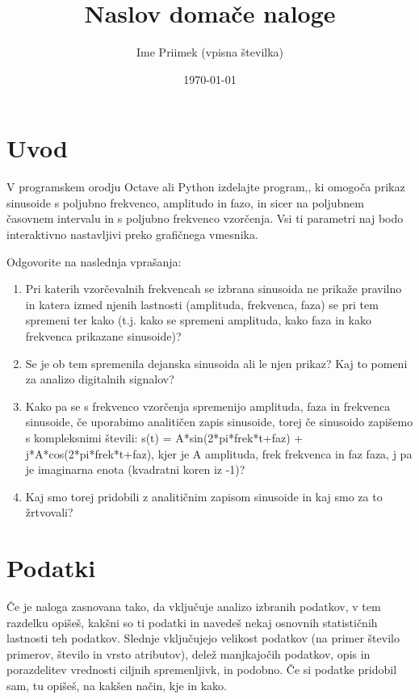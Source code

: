 \documentclass[a4paper,11pt]{article}
\title{Naslov domače naloge}
\author{Ime Priimek (vpisna številka)}
\date{\today}
\begin{document}
\maketitle

\section{Uvod}

V programskem orodju  Octave ali Python izdelajte program,, ki omogoča prikaz sinusoide s poljubno frekvenco, amplitudo in fazo, in sicer na poljubnem časovnem intervalu in s poljubno frekvenco vzorčenja. Vsi ti parametri naj bodo interaktivno nastavljivi preko grafičnega vmesnika. 

Odgovorite na naslednja vprašanja:
\begin{enumerate}
	\item Pri katerih vzorčevalnih frekvencah se izbrana sinusoida ne prikaže pravilno in katera izmed njenih lastnosti (amplituda, frekvenca, faza) se pri tem spremeni ter kako (t.j. kako se spremeni amplituda, kako faza in kako frekvenca prikazane sinusoide)?
 	\item Se je ob tem spremenila dejanska sinusoida ali le njen prikaz? Kaj to pomeni za analizo digitalnih signalov?
	\item Kako pa se s frekvenco vzorčenja spremenijo amplituda, faza in frekvenca sinusoide, če uporabimo analitičen zapis sinusoide, torej če sinusoido zapišemo s kompleksnimi števili: s(t) = A*sin(2*pi*frek*t+faz) + j*A*cos(2*pi*frek*t+faz), kjer je A amplituda, frek frekvenca in faz faza, j pa je imaginarna enota (kvadratni koren iz -1)?
	\item Kaj smo torej pridobili z analitičnim zapisom sinusoide in kaj smo za to žrtvovali?


\end{enumerate}

\section{Podatki}

Če je naloga zasnovana tako, da vključuje analizo izbranih podatkov, v
tem razdelku opišeš, kakšni so ti podatki in navedeš nekaj osnovnih
statističnih lastnosti teh podatkov. Slednje vključujejo velikost
podatkov (na primer število primerov, število in vrsto atributov), delež
manjkajočih podatkov, opis in porazdelitev vrednosti ciljnih
spremenljivk, in podobno. Če si podatke pridobil sam, tu opišeš, na
kakšen način, kje in kako.
\end{document}
